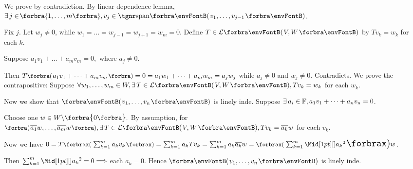 \par\quad
We prove by contradiction. By linear dependence lemma, $\exists\,j\in\!\Bra{1,\dots,m},v_j\in\Span{v_1,\dots,v_{j-1}}$.\par\quad
Fix $j$. Let $w_j\neq 0$, while $w_1=\dots=w_{j-1}=w_{j+1}=w_m=0.$ Define $T\in\Lm{V,W}$ by $Tv_k=w_k$ for each $k.$\par\quad
Suppose $a_1 v_1+\dots+a_m v_m=0,$ where $a_j\neq 0.$\par\quad
Then $T\BigPar{a_1 v_1+\dots+a_m v_m}=0=a_1 w_1+\dots+a_m w_m=a_j w_j$ while $a_j\neq 0$ and $w_j\neq 0.$ Contradicts.\PfEnd\vspace{6pt}\quad
\Or We prove the contrapositive: Suppose $\forall w_1,\dots,w_m\in W,\exists\,T\in\Lm{V,W},Tv_k=w_k$  for each $w_k.$\par\quad
{Now we show that $\Par{v_1,\dots,v_n}$ is linely inde. Suppose {$\exists\,a_i\in{\mathbb{F}},a_1 v_1+\dots+a_n v_n=0$}.}\vspace{2pt}\par\quad
{Choose one $w\in W\backslash\envFontDefault\zeroSubs.$ By assumption, for {$\BigPar{\overline{a_1}w,\dots,\overline{a_m}w},\exists\,T\in\Lm{V,W},Tv_k=\overline{a_k}w$} for each $v_k$.}\vspace{2pt}\par\quad
{Now we have {$ 0=T\XPar{\sum_{k=1}^m a_k v_k}=\sum_{k=1}^m a_k Tv_k=\sum_{k=1}^m a_k\overline{a_k}w=\XPar{\sum_{k=1}^m \aMid{a_k}{^2}}w$}.}\par\quad
{Then {$\sum_{k=1}^m\aMid{a_k}{^2}=0\Longrightarrow$ each $a_k=0.$} Hence $\Par{v_1,\dots,v_n}$ is linely inde.}\PfEnd
\SepLine

